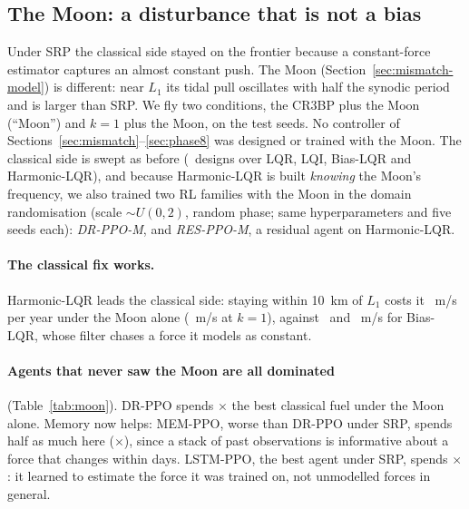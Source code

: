 \documentclass[11pt,a4paper]{article}
\newcommand{\dv}{\Delta v}
\begin{document}
\subsection{The Moon: a disturbance that is not a bias}
\label{sec:moon}

Under SRP the classical side stayed on the frontier because a constant-force
estimator captures an almost constant push. The Moon (Section~\ref{sec:mismatch-model})
is different: near $L_1$ its tidal pull oscillates with half the synodic
period and is larger than SRP. We fly two conditions, the CR3BP plus the Moon
(``Moon'') and $k = 1$ plus the Moon, on the test seeds. No controller of
Sections~\ref{sec:mismatch}--\ref{sec:phase8} was designed or trained with
the Moon. The classical side is swept as before (\moDesigns\ designs over
LQR, LQI, Bias-LQR and Harmonic-LQR), and because Harmonic-LQR is built
\emph{knowing} the Moon's frequency, we also trained two RL families with the
Moon in the domain randomisation (scale $\sim U(0, 2)$, random phase; same
hyperparameters and five seeds each): \emph{DR-PPO-M}, and \emph{RES-PPO-M},
a residual agent on Harmonic-LQR.

\begin{table}[t]
\centering
\caption{The Moon, holding, test seeds: $\dv$ divided by that of the cheapest
classical design at least as accurate, among the Moon-agnostic families (LQR,
LQI, Bias-LQR) and among all four (with Harmonic-LQR), coarse sweep, mean
$\pm$ std over 5 training seeds; and the seeds that no classical design
dominates after the dense search (for DR-PPO-M and RES-PPO-M at $k = 1$ + Moon:
after the filter search, Table~\ref{tab:k3}). $^{\dagger}$Trained with the Moon.}
\label{tab:moon}
\small

\end{table}

\paragraph{The classical fix works.} Harmonic-LQR leads the classical side:
staying within 10~km of $L_1$ costs it \moHarmTenOnly~m/s per year under the
Moon alone (\moHarmTenKone~m/s at $k = 1$), against \moBiasTenOnly\ and
\moBiasTenKone~m/s for Bias-LQR, whose filter chases a force it models as
constant.

\paragraph{Agents that never saw the Moon are all dominated}
(Table~\ref{tab:moon}). DR-PPO spends \moDrAllOnly$\times$ the best classical
fuel under the Moon alone. Memory now helps: MEM-PPO, worse than DR-PPO under
SRP, spends half as much here (\moMemAllOnly$\times$), since a stack of past
observations is informative about a force that changes within days. LSTM-PPO,
the best agent under SRP, spends \lsMoonAll$\times$: it learned to estimate the
force it was trained on, not unmodelled forces in general.
\end{document}

